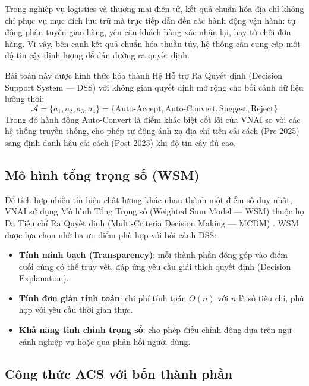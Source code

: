 Trong nghiệp vụ logistics và thương mại điện tử, kết quả chuẩn hóa địa chỉ không chỉ phục vụ mục đích lưu trữ mà trực tiếp dẫn đến các hành động vận hành: tự động phân tuyến giao hàng, yêu cầu khách hàng xác nhận lại, hay từ chối đơn hàng. Vì vậy, bên cạnh kết quả chuẩn hóa thuần túy, hệ thống cần cung cấp một độ tin cậy định lượng để dẫn đường ra quyết định.

Bài toán này được hình thức hóa thành Hệ Hỗ trợ Ra Quyết định (Decision Support System --- DSS) với không gian quyết định mở rộng cho bối cảnh dữ liệu lưỡng thời:
\begin{equation}
\mathcal{A} = \{a_1, a_2, a_3, a_4\} = \{\text{Auto-Accept}, \text{Auto-Convert}, \text{Suggest}, \text{Reject}\}
\label{eq:decision-space}
\end{equation}
Trong đó hành động Auto-Convert là điểm khác biệt cốt lõi của VNAI so với các hệ thống truyền thống, cho phép tự động ánh xạ địa chỉ tiền cải cách (Pre-2025) sang định danh hậu cải cách (Post-2025) khi độ tin cậy đủ cao.

\subsection{Mô hình tổng trọng số (WSM)}

Để tích hợp nhiều tín hiệu chất lượng khác nhau thành một điểm số duy nhất, VNAI sử dụng Mô hình Tổng Trọng số (Weighted Sum Model --- WSM) thuộc họ Đa Tiêu chí Ra Quyết định (Multi-Criteria Decision Making --- MCDM) \cite{hwang1981, saaty1980, zavadskas2019multiple}. WSM được lựa chọn nhờ ba ưu điểm phù hợp với bối cảnh DSS:
\begin{itemize}[leftmargin=*]
\item \textbf{Tính minh bạch (Transparency)}: mỗi thành phần đóng góp vào điểm cuối cùng có thể truy vết, đáp ứng yêu cầu giải thích quyết định (Decision Explanation).
\item \textbf{Tính đơn giản tính toán}: chi phí tính toán $O(n)$ với $n$ là số tiêu chí, phù hợp với yêu cầu thời gian thực.
\item \textbf{Khả năng tinh chỉnh trọng số}: cho phép điều chỉnh động dựa trên ngữ cảnh nghiệp vụ hoặc qua phản hồi người dùng.
\end{itemize}

\subsection{Công thức ACS với bốn thành phần}

